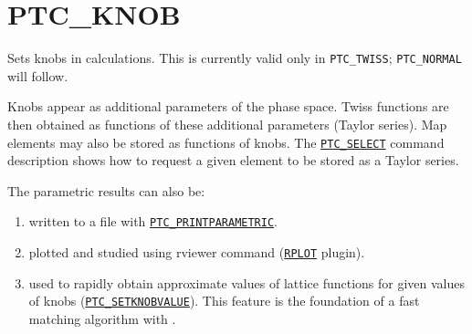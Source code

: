 


\section{PTC\_KNOB}
\label{sec:ptc_knob}


Sets knobs in \ptc calculations. This is currently valid only in
{\tt  PTC\_TWISS}; {\tt PTC\_NORMAL} will follow. 

Knobs appear as additional parameters of the phase space. Twiss
functions are then obtained as functions of these additional parameters
(Taylor series).  
Map elements may also be stored as functions of knobs. 
The \hyperref[sec:ptc_select]{\tt PTC\_SELECT} command 
description shows how to request a given element to be stored as a 
Taylor series.  

The parametric results can also be: 
\begin{enumerate}
   \item  written to a file with
     \hyperref[sec:ptc_printparametric]{\tt PTC\_PRINTPARAMETRIC}. 
   \item  plotted and studied using rviewer command
     (\hyperref[sec:rplot]{\tt RPLOT} plugin). 
   \item  used to rapidly obtain approximate values of lattice
     functions for given values of knobs
     (\hyperref[sec:ptc_setknobvalue]{\tt PTC\_SETKNOBVALUE}). This
     feature is the foundation of a fast matching algorithm with \ptc.      
\end{enumerate}


